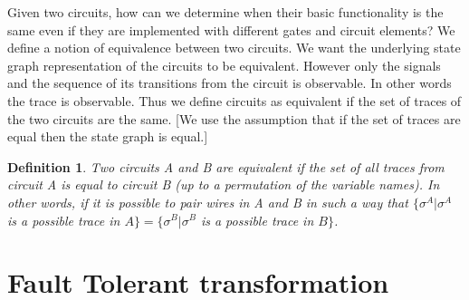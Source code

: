 \documentclass[12pt]{report}
\newtheorem*{definition}{Definition}
\begin{document}
Given two circuits, how can we determine when their basic functionality is the same even if they are implemented with different gates and circuit elements?  We define a notion of equivalence between two circuits.  We want the underlying state graph representation of the circuits to be equivalent.  However only the signals and the sequence of its transitions from the circuit is observable.  In other words the trace is observable.  Thus we define circuits as equivalent if the set of traces of the two circuits are the same. [We use the assumption that if the set of traces are equal then the state graph is equal.]
\begin{definition} Two circuits A and B are {\em equivalent} if the set of all traces from circuit A is equal to circuit B (up to a permutation of the variable names).  In other words, if it is possible to pair wires in A and B in such a way that $\{\sigma^A |\sigma^A$ is a possible trace in $A\}=\{\sigma^B |\sigma^B$ is a possible trace in $B\}$.
\end{definition}

\section{Fault Tolerant transformation}
\end{document}
